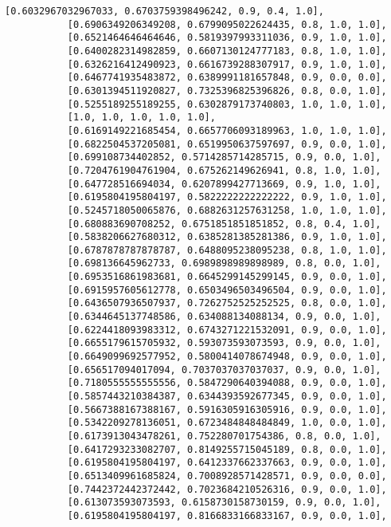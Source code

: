 \documentclass[11pt]{article}
\begin{document}
\begin{Verbatim}[commandchars=\\\{\}]
           [0.6032967032967033, 0.6703759398496242, 0.9, 0.4, 1.0],
           [0.6906349206349208, 0.6799095022624435, 0.8, 1.0, 1.0],
           [0.6521464646464646, 0.5819397993311036, 0.9, 1.0, 1.0],
           [0.6400282314982859, 0.6607130124777183, 0.8, 1.0, 1.0],
           [0.6326216412490923, 0.6616739288307917, 0.9, 1.0, 1.0],
           [0.6467741935483872, 0.6389991181657848, 0.9, 0.0, 0.0],
           [0.6301394511920827, 0.7325396825396826, 0.8, 0.0, 1.0],
           [0.5255189255189255, 0.6302879173740803, 1.0, 1.0, 1.0],
           [1.0, 1.0, 1.0, 1.0, 1.0],
           [0.6169149221685454, 0.6657706093189963, 1.0, 1.0, 1.0],
           [0.6822504537205081, 0.6519950637597697, 0.9, 0.0, 1.0],
           [0.699108734402852, 0.5714285714285715, 0.9, 0.0, 1.0],
           [0.7204761904761904, 0.675262149626941, 0.8, 1.0, 1.0],
           [0.647728516694034, 0.6207899427713669, 0.9, 1.0, 1.0],
           [0.6195804195804197, 0.5822222222222222, 0.9, 1.0, 1.0],
           [0.5245718050065876, 0.6882631257631258, 1.0, 1.0, 1.0],
           [0.680883690708252, 0.6751851851851852, 0.8, 0.4, 1.0],
           [0.5838206627680312, 0.6385281385281386, 0.9, 1.0, 1.0],
           [0.6787878787878787, 0.6488095238095238, 0.8, 1.0, 1.0],
           [0.698136645962733, 0.6989898989898989, 0.8, 0.0, 1.0],
           [0.6953516861983681, 0.6645299145299145, 0.9, 0.0, 1.0],
           [0.6915957605612778, 0.6503496503496504, 0.9, 0.0, 1.0],
           [0.6436507936507937, 0.7262752525252525, 0.8, 0.0, 1.0],
           [0.6344645137748586, 0.634088134088134, 0.9, 0.0, 1.0],
           [0.6224418093983312, 0.6743271221532091, 0.9, 0.0, 1.0],
           [0.6655179615705932, 0.593073593073593, 0.9, 0.0, 1.0],
           [0.6649099692577952, 0.5800414078674948, 0.9, 0.0, 1.0],
           [0.656517094017094, 0.7037037037037037, 0.9, 0.0, 1.0],
           [0.7180555555555556, 0.5847290640394088, 0.9, 0.0, 1.0],
           [0.5857443210384387, 0.6344393592677345, 0.9, 0.0, 1.0],
           [0.5667388167388167, 0.5916305916305916, 0.9, 0.0, 1.0],
           [0.5342209278136051, 0.6723484848484849, 1.0, 0.0, 1.0],
           [0.6173913043478261, 0.752280701754386, 0.8, 0.0, 1.0],
           [0.6417293233082707, 0.8149255715045189, 0.8, 0.0, 1.0],
           [0.6195804195804197, 0.6412337662337663, 0.9, 0.0, 1.0],
           [0.6513409961685824, 0.7008928571428571, 0.9, 0.0, 0.0],
           [0.7442372442372442, 0.7023684210526316, 0.9, 0.0, 1.0],
           [0.613073593073593, 0.6158730158730159, 0.9, 0.0, 1.0],
           [0.6195804195804197, 0.8166833166833167, 0.9, 0.0, 1.0],

\end{Verbatim}
\end{document}
